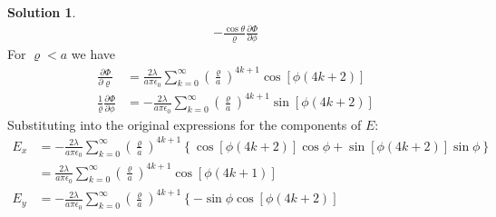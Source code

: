 \documentclass[letter,12pt]{article}
\theoremstyle{definition}
\newtheorem*{sol}{Solution}
\begin{document}
\begin{enumerate}
\begin{enumerate}
\begin{sol}
\begin{align*}
                            - \frac{\cos{\theta}}{\varrho}\frac{\partial \Phi}{\partial \phi}
                        \end{align*}
                        For $\varrho < a$ we have
                        \begin{align*}
                            \frac{\partial \Phi}{\partial \varrho}
                            &=
                            \frac{2 \lambda}{a \pi \epsilon_0}
                            \sum_{k=0}^{\infty}{\left(\frac{\varrho}{a}\right)}^{4k+1}\cos\left[\phi(4k + 2)\right]
                            \\
                            \frac{1}{\varrho}\frac{\partial \Phi}{\partial \phi}
                            &=
                            -\frac{2 \lambda}{a \pi \epsilon_0}
                            \sum_{k=0}^{\infty}{\left(\frac{\varrho}{a}\right)}^{4k+1}\sin\left[\phi(4k + 2)\right]
                        \end{align*}
                        Substituting into the original expressions for the components of $E$:
                        \begin{align*}
                            E_x &=
                            -\frac{2 \lambda}{a \pi \epsilon_0}
                            \sum_{k=0}^{\infty}
                            {\left(
                                \frac{\varrho}{a}
                            \right)}^{4k + 1}
                            \left\{
                                \cos\left[\phi \left(4k+2\right)\right]\cos\phi
                                +
                                \sin\left[\phi \left(4k+2\right)\right]\sin\phi
                            \right\}
                            \\
                            &=
                            \frac{2 \lambda}{a \pi \epsilon_0}
                            \sum_{k=0}^{\infty}
                            {\left(
                                \frac{\varrho}{a}
                            \right)}^{4k + 1}
                            \cos\left[\phi \left(4k+1\right)\right]
                            \\
                            E_y &=
                            -\frac{2 \lambda}{a \pi \epsilon_0}
                            \sum_{k=0}^{\infty}
                            {\left(
                                \frac{\varrho}{a}
                            \right)}^{4k + 1}
                            \left\{
                                -\sin\phi \cos\left[\phi \left(4k+2\right)\right]

\end{align*}
\end{sol}
\end{enumerate}
\end{enumerate}
\end{document}
